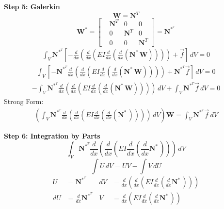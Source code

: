\documentclass{article}
\begin{document}
\textbf{Step 5: Galerkin}
\begin{equation*}
    \mathbf{W}=\mathbf{N}^T
\end{equation*}
\begin{equation}
    \mathbf{W}^*=
    \begin{bmatrix}
    &\mathbf{N}^T &0 &0\\
    &0 &\mathbf{N}^T &0\\
    &0 &0 &\mathbf{N}^T
    \end{bmatrix}=
    \mathbf{N}^*^T
\end{equation}
\begin{align}
    \int_V
    \mathbf{N}^*^T
    \left [
    -\frac{d}{dx}\left(\frac{d}{dx}\left(EI\frac{d}{dx}\left(\frac{d}{dx}\left( \mathbf{N}^*\,\mathbf{W}\right)\right)\right)\right)+\vec{f}
    \right ]\,dV=0
\end{align}
\begin{align}
    \int_V
    \left [
    -\mathbf{N}^*^T\frac{d}{dx}\left(\frac{d}{dx}\left(EI\frac{d}{dx}\left(\frac{d}{dx}\left( \mathbf{N}^*\,\mathbf{W}\right)\right)\right)\right)+\mathbf{N}^*^T\vec{f}
    \right ]\,dV=0
\end{align}
\begin{align}
    -\int_V
    \mathbf{N}^*^T\frac{d}{dx}\left(\frac{d}{dx}\left(EI\frac{d}{dx}\left(\frac{d}{dx}\left( \mathbf{N}^*\,\mathbf{W}\right)\right)\right)\right)\,dV +
    \int_V
    \mathbf{N}^*^T\vec{f}\,dV=0
\end{align}
{\Large Strong Form:}
\begin{align}
    \left (
    \int_V
    \mathbf{N}^*^T\frac{d}{dx}\left(\frac{d}{dx}\left(EI\frac{d}{dx}\left(\frac{d}{dx}\left( \mathbf{N}^*\,\right)\right)\right)\right)\,dV
    \right ) \mathbf{W} =
    \int_V
    \mathbf{N}^*^T\vec{f}\,dV
\end{align}
\vspace{10mm} %

\textbf{Step 6: Integration by Parts}
\begin{equation*}
    \int_V
    \mathbf{N}^*^T\frac{d}{dx}\left(\frac{d}{dx}\left(EI\frac{d}{dx}\left(\frac{d}{dx} \mathbf{N}^*\,\right)\right)\right)\,dV
\end{equation*}
\begin{equation}
    \int U\,dV=UV-\int V\,dU
\end{equation}
\begin{align}
        U&=\mathbf{N}^*^T & 
        dV&=\frac{d}{dx}\left(\frac{d}{dx}\left(EI\frac{d}{dx}\left(\frac{d}{dx} \mathbf{N}^*\,\right)\right)\right) \\
    dU&=\frac{d}{dx} \mathbf{N}^*^T\, & 
    V&= \frac{d}{dx}\left(EI\frac{d}{dx}\left(\frac{d}{dx} \mathbf{N}^*\,\right)\right)
\end{align}
\end{document}
